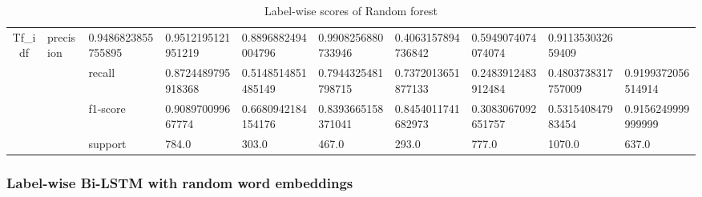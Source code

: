 \begin{table}[h!]
{\begin{tabular}{@{}ccllllllll@{}}
  \multicolumn{1}{c|}{\multirow{4}{*}{Tf\_idf}} &
  \multicolumn{1}{l|}{precision} &
  \multicolumn{1}{l|}{0.9486823855755895} &
  \multicolumn{1}{l|}{0.9512195121951219} &
  \multicolumn{1}{l|}{0.8896882494004796} &
  \multicolumn{1}{l|}{0.9908256880733946} &
  \multicolumn{1}{l|}{0.4063157894736842} &
  \multicolumn{1}{l|}{0.5949074074074074} &
  \multicolumn{1}{l|}{0.911353032659409} \\ \cmidrule(l){3-10} 
\multicolumn{1}{|c|}{} &
  \multicolumn{1}{c|}{} &
  \multicolumn{1}{l|}{recall} &
  \multicolumn{1}{l|}{0.8724489795918368} &
  \multicolumn{1}{l|}{0.5148514851485149} &
  \multicolumn{1}{l|}{0.7944325481798715} &
  \multicolumn{1}{l|}{0.7372013651877133} &
  \multicolumn{1}{l|}{0.2483912483912484} &
  \multicolumn{1}{l|}{0.4803738317757009} &
  \multicolumn{1}{l|}{0.9199372056514914} \\ \cmidrule(l){3-10} 
\multicolumn{1}{|c|}{} &
  \multicolumn{1}{c|}{} &
  \multicolumn{1}{l|}{f1-score} &
  \multicolumn{1}{l|}{0.908970099667774} &
  \multicolumn{1}{l|}{0.6680942184154176} &
  \multicolumn{1}{l|}{0.8393665158371041} &
  \multicolumn{1}{l|}{0.8454011741682973} &
  \multicolumn{1}{l|}{0.3083067092651757} &
  \multicolumn{1}{l|}{0.531540847983454} &
  \multicolumn{1}{l|}{0.9156249999999999} \\ \cmidrule(l){3-10} 
\multicolumn{1}{|c|}{} &
  \multicolumn{1}{c|}{} &
  \multicolumn{1}{l|}{support} &
  \multicolumn{1}{l|}{784.0} &
  \multicolumn{1}{l|}{303.0} &
  \multicolumn{1}{l|}{467.0} &
  \multicolumn{1}{l|}{293.0} &
  \multicolumn{1}{l|}{777.0} &
  \multicolumn{1}{l|}{1070.0} &
  \multicolumn{1}{l|}{637.0} \\ \bottomrule
\end{tabular}%
}
\caption{Label-wise scores of Random forest}
\label{tab:Label-wise-random-forest}
\end{table}

\subsubsection{Label-wise Bi-LSTM with random word embeddings}

